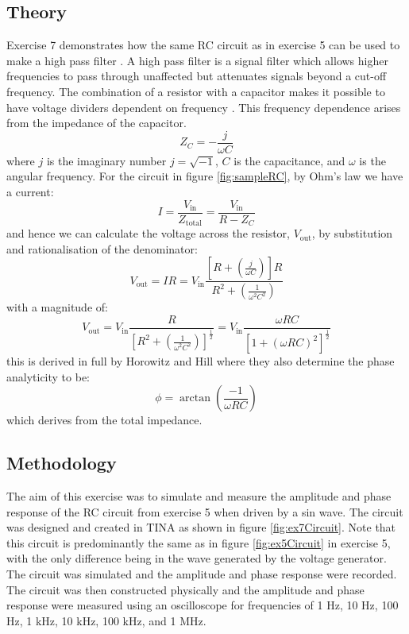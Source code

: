 \documentclass[%
reprint,
amsmath,amssymb,
aps,
floatfix
]{revtex4-2}
\begin{document}
		\subsection{Theory}
		Exercise 7 demonstrates how the same RC circuit as in exercise 5 can be used to make a high pass filter \cite{manual}. A high pass filter is a signal filter which allows higher frequencies to pass through unaffected but attenuates signals beyond a cut-off frequency. The combination of a resistor with a capacitor makes it possible to have voltage dividers dependent on frequency \cite{horowitz}. This frequency dependence arises from the impedance of the capacitor.
		\begin{equation}
			Z_C = -\frac{j}{\omega C}
			\label{eq:capacitor}
		\end{equation}where $j$ is the imaginary number $j=\sqrt{-1}$, $C$ is the capacitance, and $\omega$ is the angular frequency. For the circuit in figure \ref{fig:sampleRC}, by Ohm's law we have a current:
		\begin{equation}
			I = \frac{V_\text{in}}{Z_\text{total}} = \frac{V_\text{in}}{R - Z_C}
		\end{equation}and hence we can calculate the voltage across the resistor, $V_\text{out}$, by substitution and rationalisation of the denominator:
		\begin{equation}
			V_\text{out} = I R = V_\text{in}\frac{[R+(\frac{j}{\omega C})]R}{R^2 + (\frac{1}{\omega^2 C^2})}
		\end{equation}with a magnitude of:
		\begin{equation}
			V_\text{out} = V_\text{in}\frac{R}{\left[R^2 + \left(\frac{1}{\omega^2 C^2}\right)\right]^\frac{1}{2}} = V_\text{in} \frac{\omega R C}{\left[1 + \left(\omega RC\right)^2\right]^\frac{1}{2}}
			\label{eq:amplitude}
		\end{equation}this is derived in full by Horowitz and Hill \cite{horowitz} where they also determine the phase analyticity to be:
		\begin{equation}
			\phi = \arctan\left(\frac{-1}{\omega RC}\right)
			\label{eq:phase}
		\end{equation}which derives from the total impedance.	
	
		\subsection{Methodology}
		The aim of this exercise was to simulate and measure the amplitude and phase response of the RC circuit from exercise 5 when driven by a sin wave. The circuit was designed and created in TINA as shown in figure \ref{fig:ex7Circuit}. Note that this circuit is predominantly the same as in figure \ref{fig:ex5Circuit} in exercise 5, with the only difference being in the wave generated by the voltage generator. The circuit was simulated and the amplitude and phase response were recorded. The circuit was then constructed physically and the amplitude and phase response were measured using an oscilloscope for frequencies of 1 Hz, 10 Hz, 100 Hz, 1 kHz, 10 kHz, 100 kHz, and 1 MHz.
		
\end{document}
